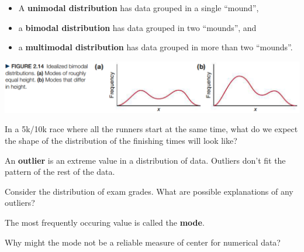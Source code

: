 \documentclass[../mathNotesPreamble]{subfiles}
\begin{document}
  \begin{defn*}
    \begin{itemize}
      \item A \textbf{unimodal distribution} has data grouped in a single ``mound'',
      \item a \textbf{bimodal distribution} has data grouped in two ``mounds'', and
      \item a \textbf{multimodal distribution} has data grouped in more than two ``mounds''.
    \end{itemize}
  \end{defn*}
  \begin{center}
    \includegraphics[width=0.95\linewidth]{images/math211_figure_2p14}
  \end{center}
  \begin{ex*}
    In a 5k/10k race where all the runners start at the same time, what do we expect the shape of the distribution of the finishing times will look like?
  \end{ex*}
  \pagebreak

  \begin{defn*}
    An \textbf{outlier} is an extreme value in a distribution of data. Outliers don't fit the pattern of the rest of the data.
  \end{defn*}
  \begin{ex*}
    Consider the distribution of exam grades. What are possible explanations of any outliers?
  \end{ex*}

  \begin{defn*}
    The most frequently occuring value is called the \textbf{mode}.
  \end{defn*}

  \noindent
  Why might the mode not be a reliable measure of center for numerical data?
  \vspace*{5\baselineskip}
  \pagebreak


  \pagebreak
\end{document}
